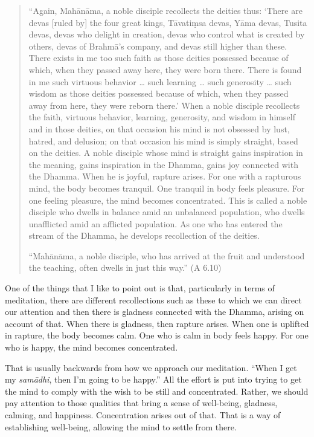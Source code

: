 \begin{quotation}
“Again, Mahānāma, a noble disciple recollects the deities thus: ‘There
are devas {[}ruled by{]} the four great kings, Tāvatiṃsa devas, Yāma
devas, Tusita devas, devas who delight in creation, devas who control
what is created by others, devas of Brahmā’s company, and devas still
higher than these. There exists in me too such faith as those deities
possessed because of which, when they passed away here, they were born
there. There is found in me such virtuous behavior \ldots{} such learning \ldots{}
such generosity \ldots{} such wisdom as those deities possessed because of
which, when they passed away from here, they were reborn there.’ When a
noble disciple recollects the faith, virtuous behavior, learning,
generosity, and wisdom in himself and in those deities, on that occasion
his mind is not obsessed by lust, hatred, and delusion; on that occasion
his mind is simply straight, based on the deities. A noble disciple
whose mind is straight gains inspiration in the meaning, gains
inspiration in the Dhamma, gains joy connected with the Dhamma. When he
is joyful, rapture arises. For one with a rapturous mind, the body
becomes tranquil. One tranquil in body feels pleasure. For one feeling
pleasure, the mind becomes concentrated. This is called a noble disciple
who dwells in balance amid an unbalanced population, who dwells
unafflicted amid an afflicted population. As one who has entered the
stream of the Dhamma, he develops recollection of the deities.

“Mahānāma, a noble disciple, who has arrived at the fruit and understood
the teaching, often dwells in just this way.” (A 6.10)
\end{quotation}

One of the things that I like to point out is that, particularly in
terms of meditation, there are different recollections such as these to
which we can direct our attention and then there is gladness connected
with the Dhamma, arising on account of that. When there is gladness,
then rapture arises. When one is uplifted in rapture, the body becomes
calm. One who is calm in body feels happy. For one who is happy, the
mind becomes concentrated.

That is usually backwards from how we approach our meditation. “When I
get my \emph{samādhi}, then I’m going to be happy.” All the effort is
put into trying to get the mind to comply with the wish to be still and
concentrated. Rather, we should pay attention to those qualities that
bring a sense of well-being, gladness, calming, and happiness.
Concentration arises out of that. That is a way of establishing
well-being, allowing the mind to settle from there.

